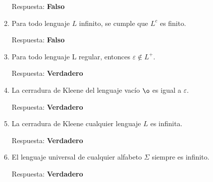 \documentclass{article}
\begin{document}
\begin{enumerate}
\begin{enumerate}
			Respuesta: \textbf{Falso}
			\item Para todo lenguaje $L$ infinito, se cumple que
				$L^c$ es finito.

			Respuesta: \textbf{Falso}
			\item Para todo lenguaje L regular, entonces
				$\varepsilon \notin L^+$.

			Respuesta: \textbf{Verdadero}
			\item La cerradura de Kleene del lenguaje vacío $\o$
				es igual a $\varepsilon$.

			Respuesta: \textbf{Verdadero}
			\item La cerradura de Kleene cualquier lenguaje $L$
				es infinita.

			Respuesta: \textbf{Verdadero}
			\item El lenguaje universal de cualquier alfabeto
				$\Sigma$ siempre es infinito.

			Respuesta: \textbf{Verdadero}
		\end{enumerate}
\end{enumerate}
\end{document}
